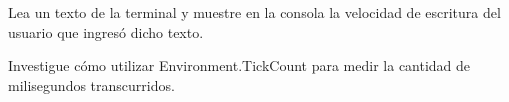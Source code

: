 Lea un texto de la terminal y muestre en la consola la velocidad de escritura del usuario que ingresó dicho texto.

Investigue cómo utilizar Environment.TickCount para medir la cantidad de milisegundos transcurridos.